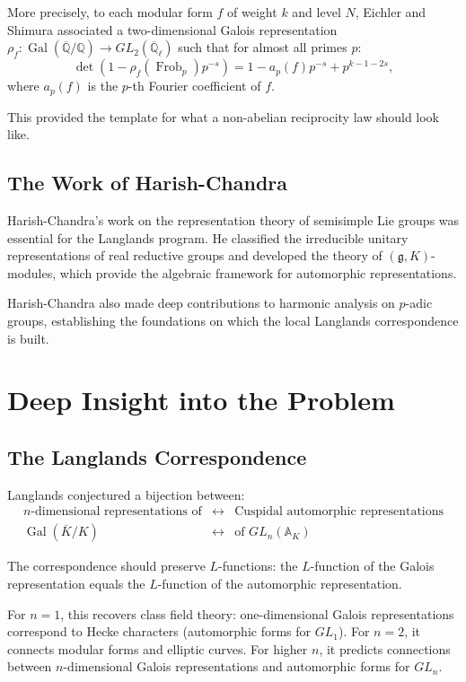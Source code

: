 More precisely, to each modular form $f$ of weight $k$ and level $N$, Eichler and Shimura associated a two-dimensional Galois representation $\rho_f: \operatorname{Gal}(\overline{\mathbb{Q}}/\mathbb{Q}) \to GL_2(\overline{\mathbb{Q}}_\ell)$ such that for almost all primes $p$:
\[
\det(1 - \rho_f(\operatorname{Frob}_p) p^{-s}) = 1 - a_p(f) p^{-s} + p^{k-1-2s},
\]
where $a_p(f)$ is the $p$-th Fourier coefficient of $f$.

This provided the template for what a non-abelian reciprocity law should look like.

\subsection{The Work of Harish-Chandra}

Harish-Chandra's work on the representation theory of semisimple Lie groups was essential for the Langlands program. He classified the irreducible unitary representations of real reductive groups and developed the theory of $(\mathfrak{g}, K)$-modules, which provide the algebraic framework for automorphic representations.

Harish-Chandra also made deep contributions to harmonic analysis on $p$-adic groups, establishing the foundations on which the local Langlands correspondence is built.

\section{Deep Insight into the Problem}

\subsection{The Langlands Correspondence}

Langlands conjectured a bijection between:
\[
\begin{array}{ccc}
\text{$n$-dimensional representations of} & \longleftrightarrow & \text{Cuspidal automorphic representations} \\
\operatorname{Gal}(\overline{K}/K) & \longleftrightarrow & \text{of } GL_n(\mathbb{A}_K)
\end{array}
\]

The correspondence should preserve $L$-functions: the $L$-function of the Galois representation equals the $L$-function of the automorphic representation.

For $n=1$, this recovers class field theory: one-dimensional Galois representations correspond to Hecke characters (automorphic forms for $GL_1$). For $n=2$, it connects modular forms and elliptic curves. For higher $n$, it predicts connections between $n$-dimensional Galois representations and automorphic forms for $GL_n$.

